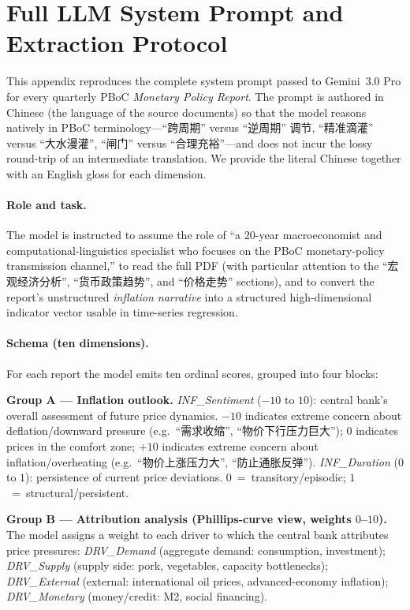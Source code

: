\documentclass[AER]{AEA}
\begin{document}



\appendix

\section{Full LLM System Prompt and Extraction Protocol}\label{app:prompt}

This appendix reproduces the complete system prompt passed to Gemini~3.0
Pro for every quarterly PBoC \emph{Monetary Policy Report}. The prompt is
authored in Chinese (the language of the source documents) so that the
model reasons natively in PBoC terminology---``跨周期'' versus ``逆周期''
调节, ``精准滴灌'' versus ``大水漫灌'', ``闸门'' versus ``合理充裕''---and
does not incur the lossy round-trip of an intermediate translation. We
provide the literal Chinese together with an English gloss for each
dimension.

\paragraph{Role and task.} The model is instructed to assume the role of
``a 20-year macroeconomist and computational-linguistics specialist who
focuses on the PBoC monetary-policy transmission channel,'' to read the
full PDF (with particular attention to the ``宏观经济分析'',
``货币政策趋势'', and ``价格走势'' sections), and to convert the report's
unstructured \emph{inflation narrative} into a structured high-dimensional
indicator vector usable in time-series regression.

\paragraph{Schema (ten dimensions).} For each report the model emits ten
ordinal scores, grouped into four blocks:

\textbf{Group A --- Inflation outlook.}
\textit{INF\_Sentiment} ($-10$ to $10$): central bank's overall
assessment of future price dynamics. $-10$ indicates extreme concern about
deflation/downward pressure (e.g.\ ``需求收缩'', ``物价下行压力巨大''); $0$
indicates prices in the comfort zone; $+10$ indicates extreme concern
about inflation/overheating (e.g.\ ``物价上涨压力大'', ``防止通胀反弹'').
\textit{INF\_Duration} ($0$ to $1$): persistence of current price
deviations. $0$~=~transitory/episodic; $1$~=~structural/persistent.

\textbf{Group B --- Attribution analysis (Phillips-curve view, weights $0$--$10$).}
The model assigns a weight to each driver to which the central bank
attributes price pressures: \textit{DRV\_Demand} (aggregate demand:
consumption, investment); \textit{DRV\_Supply} (supply side: pork,
vegetables, capacity bottlenecks); \textit{DRV\_External} (external:
international oil prices, advanced-economy inflation); \textit{DRV\_Monetary}
(money/credit: M2, social financing).
\end{document}
